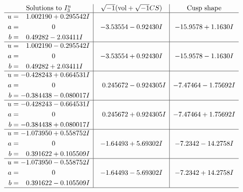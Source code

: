 \documentclass[1p]{elsarticle_modified}
\theoremstyle{definition}
\newcommand{\I}{\sqrt{-1}}
\begin{document}
$$\begin{array}{c|c|c}  
\text{Solutions to }I^u_{3}& \I (\text{vol} + \sqrt{-1}CS) & \text{Cusp shape}\\
 \hline 
\begin{aligned}
u &= \phantom{-}1.002190 + 0.295542 I \\
a &= \phantom{-0.000000 } 0 \\
b &= \phantom{-}0.49282 - 2.03411 I\end{aligned}
 & -3.53554 - 0.92430 I & -15.9578 + 1.1630 I \\ \hline\begin{aligned}
u &= \phantom{-}1.002190 - 0.295542 I \\
a &= \phantom{-0.000000 } 0 \\
b &= \phantom{-}0.49282 + 2.03411 I\end{aligned}
 & -3.53554 + 0.92430 I & -15.9578 - 1.1630 I \\ \hline\begin{aligned}
u &= -0.428243 + 0.664531 I \\
a &= \phantom{-0.000000 } 0 \\
b &= -0.384438 - 0.080017 I\end{aligned}
 & \phantom{-}0.245672 - 0.924305 I & -7.47464 - 1.75692 I \\ \hline\begin{aligned}
u &= -0.428243 - 0.664531 I \\
a &= \phantom{-0.000000 } 0 \\
b &= -0.384438 + 0.080017 I\end{aligned}
 & \phantom{-}0.245672 + 0.924305 I & -7.47464 + 1.75692 I \\ \hline\begin{aligned}
u &= -1.073950 + 0.558752 I \\
a &= \phantom{-0.000000 } 0 \\
b &= \phantom{-}0.391622 + 0.105509 I\end{aligned}
 & -1.64493 + 5.69302 I & -7.2342 - 14.2758 I \\ \hline\begin{aligned}
u &= -1.073950 - 0.558752 I \\
a &= \phantom{-0.000000 } 0 \\
b &= \phantom{-}0.391622 - 0.105509 I\end{aligned}
 & -1.64493 - 5.69302 I & -7.2342 + 14.2758 I\\
 \hline 
 \end{array}$$\newpage
\newpage\renewcommand{\arraystretch}{1}
\end{document}
